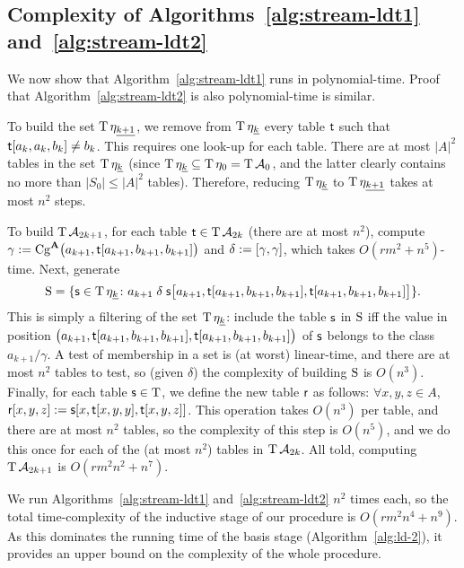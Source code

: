   
  \subsection{Complexity of Algorithms~\ref{alg:stream-ldt1} and~\ref{alg:stream-ldt2}}
  We now show that Algorithm~\ref{alg:stream-ldt1} runs in polynomial-time.
  Proof that Algorithm~\ref{alg:stream-ldt2} is also polynomial-time is similar.
  
  To build the set $\operatorname{T} \eta_{\underline{k+1}}$, we remove 
  from $\operatorname{T} \eta_{\underline{k}}$ every table $\mathsf{t}$ such that $\mathsf{t}[a_k,a_k,b_k]\neq b_k$.
  This requires one look-up for each table.  There are 
  at most $|A|^2$ tables in the set $\operatorname{T} \eta_{\underline{k}}$
  (since $\operatorname{T} \eta_{\underline{k}} \subseteq \operatorname{T} \eta_0 = \operatorname{T} \mathcal{A}_0$, and 
  the latter clearly contains no more than $|S_0| \leq |A|^2$ tables).
  Therefore, reducing $\operatorname{T} \eta_{\underline{k}}$ to $\operatorname{T} \eta_{\underline{k+1}}$ takes at most $n^2$ steps.
  
  To build $\operatorname{T} \mathcal{A}_{2k+1}$,
  for each table $\mathsf{t} \in \operatorname{T} \mathcal{A}_{2k}$ (there are at most $n^2$),
  compute $\gamma := \operatorname{Cg}^{\mathbf{A}}\bigl(a_{k+1}, \mathsf{t}[a_{k+1}, b_{k+1}, b_{k+1}]\bigr)$ and 
  $\delta := [\gamma, \gamma]$, which takes
  $O(rm^2 + n^5)$-time.  Next, generate
  \[
    \operatorname{S} = \{\mathsf{s} \in \operatorname{T} \eta_{\underline{k}} \colon  a_{k+1} \mathrel{\delta} 
    \mathsf{s} \bigl[a_{k+1},  \mathsf{t}[a_{k+1}, b_{k+1}, b_{k+1}],  \mathsf{t}[a_{k+1}, b_{k+1}, b_{k+1}]\bigr]\}.
  \]
  This is simply a filtering of the set $\operatorname{T} \eta_{\underline{k}}$:
  include the table $\mathsf{s}$ in $\operatorname{S}$ iff the value in position 
  $\bigl(a_{k+1},  \mathsf{t}[a_{k+1}, b_{k+1}, b_{k+1}],  \mathsf{t}[a_{k+1}, b_{k+1}, b_{k+1}]\bigr)$
  of $\mathsf{s}$ belongs to the class $a_{k+1}/\gamma$.
  A test of membership in a set is (at worst) linear-time, and there are at 
  most $n^2$ tables to test, so (given $\delta$) the complexity of building 
  $\operatorname{S}$ is $O(n^3)$.
  Finally, for each table $\mathsf{s} \in \operatorname{T}$, we define the new table
  $\mathsf{r}$ as follows:
  $\forall x, y, z \in A$, $\mathsf{r}[x,y,z] :=  \mathsf{s}[x, \mathsf{t}[x,y,y], \mathsf{t}[x,y,z]]$. 
  This operation takes $O(n^3)$ per table, and there are at most $n^2$ tables, 
  so the complexity of this step is $O(n^5)$, and we do this once for each of the
  (at most $n^2$) tables in $\operatorname{T} \mathcal{A}_{2k}$.  All told, computing 
  $\operatorname{T} \mathcal{A}_{2k+1}$ is $O(rm^2n^2 + n^7)$.
  
  We run Algorithms~\ref{alg:stream-ldt1} and~\ref{alg:stream-ldt2} $n^2$ times each,
  so the total time-complexity of the inductive stage of our procedure is
  $O(rm^2n^4 + n^9)$. As this dominates the running time of the basis 
  stage (Algorithm~\ref{alg:ld-2}), it provides an upper bound on the 
  complexity of the whole procedure.
  
